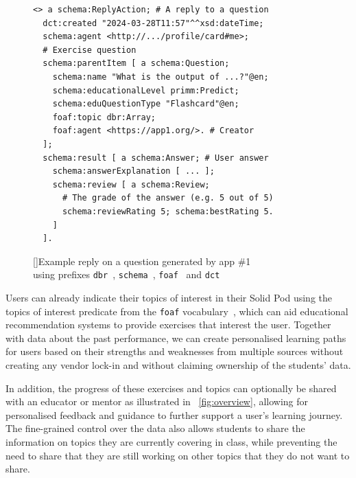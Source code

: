 \begin{figure}[htb]
\begin{minipage}[t]{0.39\textwidth}
\label{fig:overview}
\end{minipage}\hfill
\begin{minipage}[t]{0.59\textwidth}
\vspace{0pt}
\begin{verbatim}
<> a schema:ReplyAction; # A reply to a question
  dct:created "2024-03-28T11:57"^^xsd:dateTime;
  schema:agent <http://.../profile/card#me>;
  # Exercise question
  schema:parentItem [ a schema:Question;
    schema:name "What is the output of ...?"@en;
    schema:educationalLevel primm:Predict;
    schema:eduQuestionType "Flashcard"@en;
    foaf:topic dbr:Array;
    foaf:agent <https://app1.org/>. # Creator
  ];
  schema:result [ a schema:Answer; # User answer
    schema:answerExplanation [ ... ];
    schema:review [ a schema:Review;
      # The grade of the answer (e.g. 5 out of 5)
      schema:reviewRating 5; schema:bestRating 5.
    ]
  ].
\end{verbatim}
\vspace{3.6pt}
[]{Example reply on a question generated by app \#1\\
using prefixes \texttt{dbr}~\cite{10.1007/978-3-540-76298-0_52}, \texttt{schema}~\cite{10.1002/asi.24744}, \texttt{foaf}~\cite{brickley2007foaf} and \texttt{dct}~\cite{weibel1998dublin}}
\label{lst:exercise}
\end{minipage}
\end{figure}

Users can already indicate their topics of interest in their Solid Pod using the topics of interest predicate from the \texttt{foaf} vocabulary~\cite{brickley2007foaf}, which can aid educational recommendation systems to provide exercises that interest the user. Together with data about the past performance, we can create personalised learning paths for users based on their strengths and weaknesses from multiple sources without creating any vendor lock-in and without claiming ownership of the students' data.

In addition, the progress of these exercises and topics can optionally be shared with an educator or mentor as illustrated in \figurename~\ref{fig:overview}, allowing for personalised feedback and guidance to further support a user's learning journey. The fine-grained control over the data also allows students to share the information on topics they are currently covering in class, while preventing the need to share that they are still working on other topics that they do not want to share.


